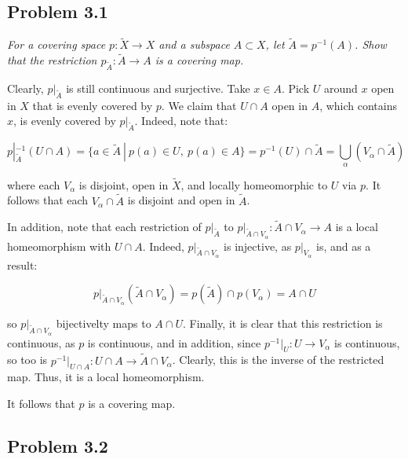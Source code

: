 \documentclass[10pt, oneside]{amsart}
\begin{document}
    \hrulefill

    \subsection{Problem 3.1}

    \textit{For a covering space $p : \tilde{X} \rightarrow X$ and a subspace $A \subset X$, let $\tilde{A} = p^{-1}(A)$. Show that the restriction $p_{\tilde{A}} : \tilde{A} \rightarrow A$ is a covering map.}
    \newline

    Clearly, $p|_{\tilde{A}}$ is still continuous and surjective. Take $x \in A$. Pick $U$ around $x$ open in $X$ that is evenly covered by $p$. We claim that $U \cap A$ open in $A$, which contains $x$, is evenly covered by $p|_{\tilde{A}}$.
    Indeed, note that:

    $$p|_{\tilde{A}}^{-1}(U \cap A) = \{a \in \tilde{A} \ | \ p(a) \in U, \ p(a) \in A \} = p^{-1}(U) \cap \tilde{A} = \displaystyle\bigcup_{\alpha} (V_{\alpha} \cap \tilde{A})$$

    where each $V_{\alpha}$ is disjoint, open in $\tilde{X}$, and locally homeomorphic to $U$ via $p$. It follows that each $V_{\alpha} \cap \tilde{A}$ is disjoint and open in $\tilde{A}$.
    \newline

    In addition,
    note that each restriction of $p|_{\tilde{A}}$ to $p|_{\tilde{A} \cap V_{\alpha}} : \tilde{A} \cap V_{\alpha} \rightarrow A$ is a local homeomorphism with $U \cap A$. Indeed, $p|_{\tilde{A} \cap V_{\alpha}}$ is injective, as $p|_{V_{\alpha}}$ is, and as a result:

    $$p|_{\tilde{A} \cap V_{\alpha}}(\tilde{A} \cap V_{\alpha}) = p(\tilde{A}) \cap p(V_{\alpha}) = A \cap U$$

    so $p|_{\tilde{A} \cap V_{\alpha}}$ bijectivelty maps to $A \cap U$. Finally, it is clear that this restriction is continuous, as $p$ is continuous, and in addition, since $p^{-1} |_{U} : U \rightarrow V_{\alpha}$ is continuous, so too is
    $p^{-1} |_{U \cap A} : U \cap A \rightarrow \tilde{A} \cap V_{\alpha}$. Clearly, this is the inverse of the restricted map. Thus, it is a local homeomorphism.
    \newline

    It follows that $p$ is a covering map.

    \hrulefill

    \subsection{Problem 3.2}
\end{document}
